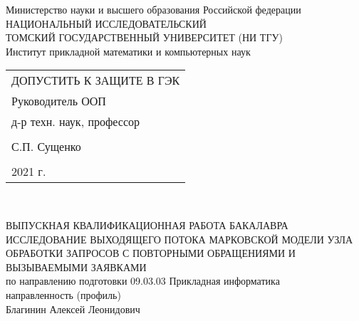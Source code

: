 	\begin{center}\linespread{1}
		\normalsize{Министерство науки и высшего образования Российской федерации}\\
		\normalsize{НАЦИОНАЛЬНЫЙ ИССЛЕДОВАТЕЛЬСКИЙ}\\ 
		\normalsize{ТОМСКИЙ ГОСУДАРСТВЕННЫЙ УНИВЕРСИТЕТ (НИ ТГУ)}\\
		\normalsize{Институт прикладной математики и компьютерных наук}\\
		\hfill\break
		
	\end{center}
\begin{flushright}\linespread{0.9}
	\normalsize{ 
		\begin{tabular}{@{}l@{}}
			ДОПУСТИТЬ К ЗАЩИТЕ В ГЭК\\ 
			Руководитель ООП\\  д-р техн. наук,  профессор\\\\ \underline{\hspace{3.5cm}} С.П. Сущенко\\\\
			\textquote{\underline{\hspace{1cm}}}\underline{\hspace{4cm}}2021 г.	
		\end{tabular}	
	}\\
\end{flushright}
\hfill \break
\hfill \break
\begin{center}\linespread{1}
		\large{ВЫПУСКНАЯ КВАЛИФИКАЦИОННАЯ РАБОТА БАКАЛАВРА}\\
		\hfill \break
		\large{ИССЛЕДОВАНИЕ ВЫХОДЯЩЕГО ПОТОКА МАРКОВСКОЙ МОДЕЛИ УЗЛА ОБРАБОТКИ ЗАПРОСОВ С ПОВТОРНЫМИ ОБРАЩЕНИЯМИ И ВЫЗЫВАЕМЫМИ ЗАЯВКАМИ}\\
		\hfill \break
		\normalsize{по направлению подготовки 09.03.03 Прикладная информатика\\
		направленность (профиль)  \\
		\hfill \break
	Благинин Алексей Леонидович}\\
		\hfill \break
		\hfill \break
	\end{center}
